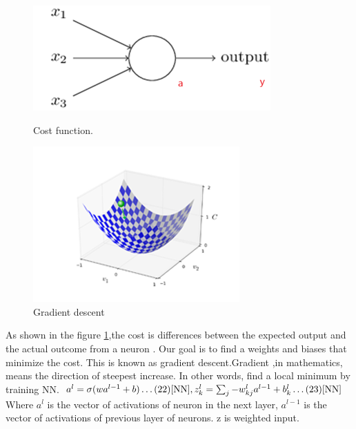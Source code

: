 \documentclass{article}
\begin{document}
\begin{figure}[H]
  \centering
  \begin{minipage}[b]{0.4\textwidth}
    \includegraphics[width=\textwidth]{img/gradient1.png}
    \caption{Cost function.}
    \label{cost}
  \end{minipage}
  \hfill
  \begin{minipage}[b]{0.5\textwidth}
    \includegraphics[width=\textwidth]{img/gradient2.png}
    \caption{Gradient descent}
  \end{minipage}
\end{figure}
As shown in the figure \ref{cost},the cost is differences between the expected output and the actual outcome from a neuron . Our goal is to find a weights and biases that minimize the cost. This is known as gradient descent.Gradient ,in mathematics, means the direction of steepest increase. In other words, find a local minimum by training NN.
$\\a^l =\sigma{(wa^{l-1}+b)} \dots (22)\cite{NN} ,\\
z^l_k =\sum_{j}-w^l_{kj}a^{l-1}+b^l_k \dots  (23)\cite{NN}\\$
Where $a^l$ is the vector of activations of neuron in the next layer, $a^{l-1}$ is the vector of activations of previous layer of neurons. z is weighted input.
\end{document}
